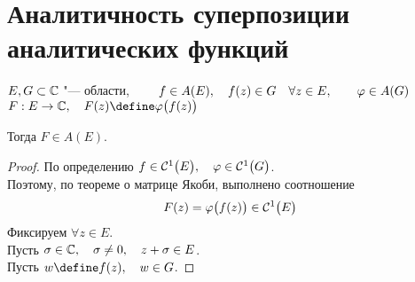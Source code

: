 \section{Аналитичность суперпозиции аналитических функций}

\begin{theorem}
	$ E, G \sub \Co $ "--- области, $ \qquad f \in A(E), \quad f(z) \in G \quad \forall z \in E, \qquad \vphi \in A(G) $ \\
	$ F : E \to \Co, \quad F(z) \define \vphi \big( f(z) \big) $

	Тогда $ F \in A(E) $.
\end{theorem}

\begin{proof}
	По определению $ f \in \Cont[1] E, \quad \vphi \in \Cont[1]G $. \\
	Поэтому, по теореме о матрице Якоби, выполнено соотношение
	$$ F(z) = \vphi \big( f(z) \big) \in \Cont[1]E $$
	Фиксируем $ \forall z \in E $. \\
	Пусть $ \sigma \in \Co, \quad \sigma \ne 0, \quad z + \sigma \in E $. \\
	Пусть $ w \define f(z), \quad w \in G $.


\end{proof}
